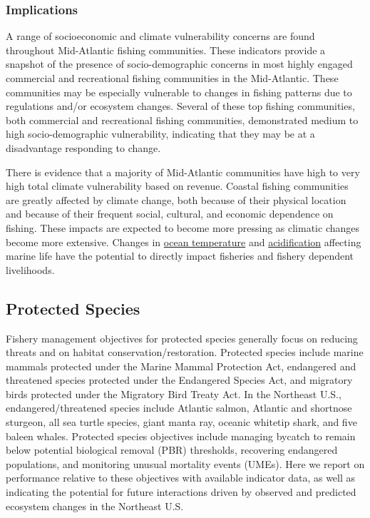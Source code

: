 \documentclass[
  10pt,
]{article}
\begin{document}
\hypertarget{implications-4}{%
\subsubsection{Implications}\label{implications-4}}

A range of socioeconomic and climate vulnerability concerns are found throughout Mid-Atlantic fishing communities. These indicators provide a snapshot of the presence of socio-demographic concerns in most highly engaged commercial and recreational fishing communities in the Mid-Atlantic. These communities may be especially vulnerable to changes in fishing patterns due to regulations and/or ecosystem changes. Several of these top fishing communities, both commercial and recreational fishing communities, demonstrated medium to high socio-demographic vulnerability, indicating that they may be at a disadvantage responding to change.

There is evidence that a majority of Mid-Atlantic communities have high to very high total climate vulnerability based on revenue. Coastal fishing communities are greatly affected by climate change, both because of their physical location and because of their frequent social, cultural, and economic dependence on fishing. These impacts are expected to become more pressing as climatic changes become more extensive. Changes in \href{https://noaa-edab.github.io/catalog/bottom_temp_insitu.html}{ocean temperature} and \href{https://noaa-edab.github.io/catalog/ocean_acidification.html}{acidification} affecting marine life have the potential to directly impact fisheries and fishery dependent livelihoods.

\hypertarget{protected-species}{%
\subsection{Protected Species}\label{protected-species}}

Fishery management objectives for protected species generally focus on reducing threats and on habitat conservation/restoration. Protected species include marine mammals protected under the Marine Mammal Protection Act, endangered and threatened species protected under the Endangered Species Act, and migratory birds protected under the Migratory Bird Treaty Act. In the Northeast U.S., endangered/threatened species include Atlantic salmon, Atlantic and shortnose sturgeon, all sea turtle species, giant manta ray, oceanic whitetip shark, and five baleen whales. Protected species objectives include managing bycatch to remain below potential biological removal (PBR) thresholds, recovering endangered populations, and monitoring unusual mortality events (UMEs). Here we report on performance relative to these objectives with available indicator data, as well as indicating the potential for future interactions driven by observed and predicted ecosystem changes in the Northeast U.S.
\end{document}
